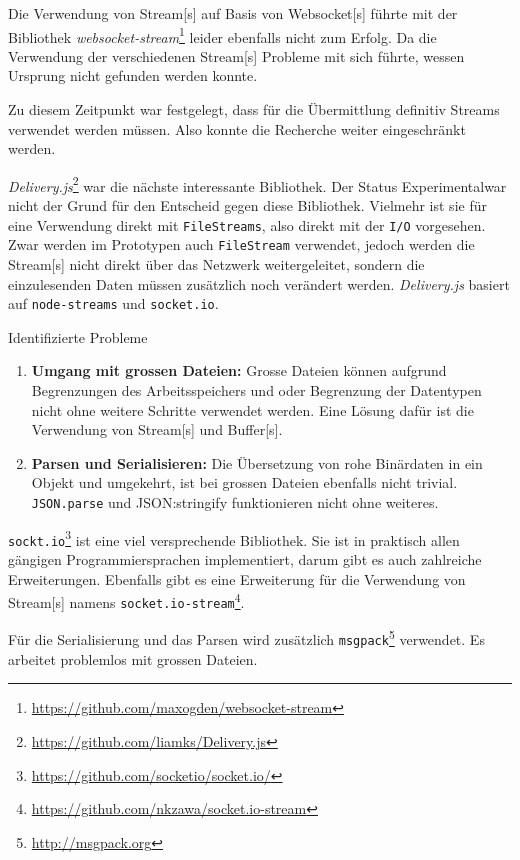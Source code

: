 Die Verwendung von \gls{Stream}[s] auf Basis von \gls{Websocket}[s] führ\-te mit der Bi\-blio\-thek \textit{websocket-stream}\footnote{\url{https://github.com/maxogden/websocket-stream}} leider ebenfalls nicht zum Erfolg. Da die Verwendung der verschiedenen \gls{Stream}[s] Probleme mit sich führte, wessen Ursprung nicht gefunden werden konnte.

Zu diesem Zeitpunkt war festgelegt, dass für die Übermittlung definitiv Streams verwendet werden müssen. Also konnte die Recherche weiter eingeschränkt werden.

\textit{Delivery.js}\footnote{\url{https://github.com/liamks/Delivery.js}} war die nächste interessante Bibliothek. Der Status \glqq Experimental\grqq war nicht der Grund für den Entscheid gegen diese Bibliothek. Vielmehr ist sie für eine Verwendung direkt mit \texttt{FileStreams}, also direkt mit der \texttt{I/O} vorgesehen. Zwar werden im Prototypen auch \texttt{FileStream} verwendet, jedoch werden die \gls{Stream}[s] nicht direkt über das Netzwerk weitergeleitet, sondern die einzulesenden Daten müssen zusätzlich noch verändert werden. \textit{Delivery.js} basiert auf \texttt{node-streams} und \texttt{socket.io}.

Identifizierte Probleme
\begin{enumerate}
    \item \textbf{Umgang mit grossen Dateien:} Grosse Dateien können aufgrund Begrenzungen des Arbeitsspeichers und oder Begrenzung der Datentypen nicht ohne weitere Schritte verwendet werden. Eine Lösung dafür ist die Verwendung von \gls{Stream}[s] und \gls{Buffer}[s].
    \item \textbf{Parsen und Serialisieren:} Die Übersetzung von rohe Binärdaten in ein Objekt und umgekehrt, ist bei grossen Dateien ebenfalls nicht trivial. \texttt{JSON.parse} und {JSON:stringify} funktionieren nicht ohne weiteres.
\end{enumerate}

\texttt{sockt.io}\footnote{\url{https://github.com/socketio/socket.io/}} ist eine viel versprechende Bibliothek. Sie ist in praktisch allen gängigen Programmiersprachen implementiert, darum gibt es auch zahlreiche Erweiterungen. Ebenfalls gibt es eine Erweiterung für die Verwendung von \gls{Stream}[s] namens \texttt{socket.io-stream}\footnote{\url{https://github.com/nkzawa/socket.io-stream}}.

Für die Serialisierung und das Parsen wird zusätzlich \texttt{msgpack}\footnote{\url{http://msgpack.org}} verwendet. Es arbeitet problemlos mit grossen Dateien.

